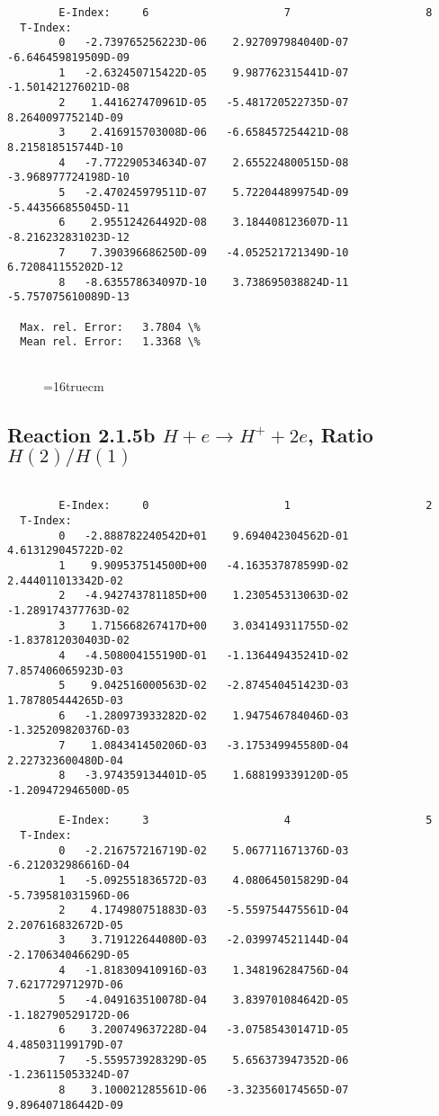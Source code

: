 \documentclass[12pt,dvipdfmx]{article}
\begin{document}
{\begin{small}
\begin{verbatim}
        E-Index:     6                     7                     8
  T-Index:
        0   -2.739765256223D-06    2.927097984040D-07   -6.646459819509D-09
        1   -2.632450715422D-05    9.987762315441D-07   -1.501421276021D-08
        2    1.441627470961D-05   -5.481720522735D-07    8.264009775214D-09
        3    2.416915703008D-06   -6.658457254421D-08    8.215818515744D-10
        4   -7.772290534634D-07    2.655224800515D-08   -3.968977724198D-10
        5   -2.470245979511D-07    5.722044899754D-09   -5.443566855045D-11
        6    2.955124264492D-08    3.184408123607D-11   -8.216232831023D-12
        7    7.390396686250D-09   -4.052521721349D-10    6.720841155202D-12
        8   -8.635578634097D-10    3.738695038824D-11   -5.757075610089D-13

  Max. rel. Error:   3.7804 \%
  Mean rel. Error:   1.3368 \%


\end{verbatim}\end{small}
\begin{figure} \label{2.1.5a}
\epsfxsize=16truecm
\end{figure}

\newpage
\subsection{
Reaction 2.1.5b  $H + e \rightarrow H^+ + 2e$, Ratio $H(2)/H(1)$
}


\begin{small}\begin{verbatim}

        E-Index:     0                     1                     2
  T-Index:
        0   -2.888782240542D+01    9.694042304562D-01    4.613129045722D-02
        1    9.909537514500D+00   -4.163537878599D-02    2.444011013342D-02
        2   -4.942743781185D+00    1.230545313063D-02   -1.289174377763D-02
        3    1.715668267417D+00    3.034149311755D-02   -1.837812030403D-02
        4   -4.508004155190D-01   -1.136449435241D-02    7.857406065923D-03
        5    9.042516000563D-02   -2.874540451423D-03    1.787805444265D-03
        6   -1.280973933282D-02    1.947546784046D-03   -1.325209820376D-03
        7    1.084341450206D-03   -3.175349945580D-04    2.227323600480D-04
        8   -3.974359134401D-05    1.688199339120D-05   -1.209472946500D-05

        E-Index:     3                     4                     5
  T-Index:
        0   -2.216757216719D-02    5.067711671376D-03   -6.212032986616D-04
        1   -5.092551836572D-03    4.080645015829D-04   -5.739581031596D-06
        2    4.174980751883D-03   -5.559754475561D-04    2.207616832672D-05
        3    3.719122644080D-03   -2.039974521144D-04   -2.170634046629D-05
        4   -1.818309410916D-03    1.348196284756D-04    7.621772971297D-06
        5   -4.049163510078D-04    3.839701084642D-05   -1.182790529172D-06
        6    3.200749637228D-04   -3.075854301471D-05    4.485031199179D-07
        7   -5.559573928329D-05    5.656373947352D-06   -1.236115053324D-07
        8    3.100021285561D-06   -3.323560174565D-07    9.896407186442D-09


\end{verbatim}
\end{small}}
\end{document}
